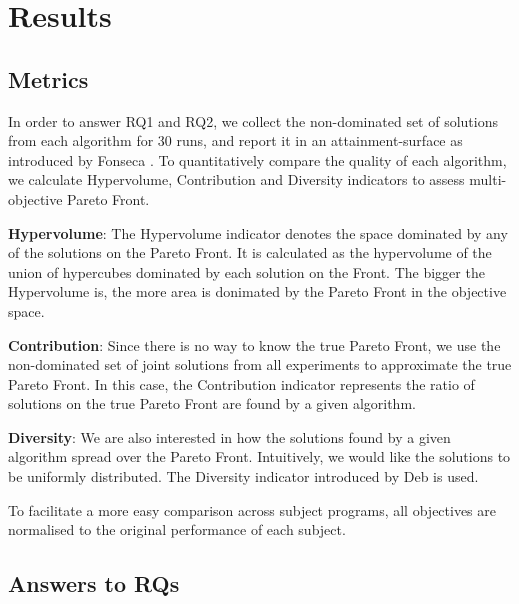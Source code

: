 
\section{Results}
\label{sec_results}
\subsection{Metrics}
\label{sec_matrics}

In order to answer RQ1 and RQ2, we collect the non-dominated set of solutions from each algorithm for 30 runs, and report it in an attainment-surface as introduced by Fonseca \cite{attainment_surface:1996}. To quantitatively compare the quality of each algorithm, we calculate Hypervolume, Contribution and Diversity indicators to assess multi-objective Pareto Front.

\textbf{Hypervolume}: The Hypervolume indicator \cite{797969} denotes the space dominated by any of the solutions on the Pareto Front. It is calculated as the hypervolume of the union of hypercubes dominated by each solution on the Front. The bigger the Hypervolume is, the more area is donimated by the Pareto Front in the objective space.

\textbf{Contribution}: Since there is no way to know the true Pareto Front, we use the non-dominated set of joint solutions from all experiments to approximate the true Pareto Front. In this case, the Contribution indicator represents the ratio of solutions on the true Pareto Front are found by a given algorithm.

\textbf{Diversity}: We are also interested in how the solutions found by a given algorithm spread over the Pareto Front. Intuitively, we would like the solutions to be uniformly distributed. The Diversity indicator introduced by Deb \cite{996017} is used.

To facilitate a more easy comparison across subject programs, all objectives are normalised to the original performance of each subject.

\subsection{Answers to RQs}
\label{sec_answers}

\newcommand{\shallow}{Sha}
\newcommand{\all}{All}
\newcommand{\randomsearch}{Rand}
\newcommand{\nsgaii}{NSGA}
\newcommand{\sr}{\emph{\shallow\randomsearch}}
\newcommand{\sn}{\emph{\shallow\nsgaii}}
\newcommand{\dr}{\emph{\all\randomsearch}}
\newcommand{\dn}{\emph{\all\nsgaii}}

